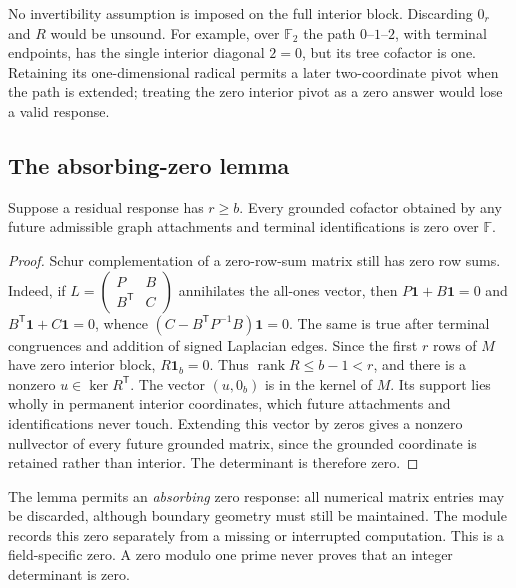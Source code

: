 No invertibility assumption is imposed on the full interior block.
Discarding $0_r$ and $R$ would be unsound.  For example, over
$\mathbb F_2$ the path $0$--$1$--$2$, with terminal endpoints, has the
single interior diagonal $2=0$, but its tree cofactor is one.  Retaining
its one-dimensional radical permits a later two-coordinate pivot when
the path is extended; treating the zero interior pivot as a zero answer
would lose a valid response.

\subsection{The absorbing-zero lemma}

\begin{lemma}
\label{lem:response-zero}
Suppose a residual response has $r\ge b$.  Every grounded cofactor
obtained by any future admissible graph attachments and terminal
identifications is zero over $\mathbb F$.
\end{lemma}

\begin{proof}
Schur complementation of a zero-row-sum matrix still has zero row sums.
Indeed, if
$L=\left(\begin{smallmatrix}P&B\\B^{\mathsf T}&C\end{smallmatrix}\right)$
annihilates the all-ones vector, then
$P\mathbf1+B\mathbf1=0$ and
$B^{\mathsf T}\mathbf1+C\mathbf1=0$, whence
$(C-B^{\mathsf T}P^{-1}B)\mathbf1=0$.
The same is true after terminal congruences and addition of signed
Laplacian edges.  Since the first $r$ rows of $M$ have zero interior
block, $R\mathbf1_b=0$.  Thus
$\operatorname{rank}R\le b-1<r$, and there is a nonzero
$u\in\ker R^{\mathsf T}$.  The vector $(u,0_b)$ is in the kernel of
$M$.  Its support lies wholly in permanent interior coordinates, which
future attachments and identifications never touch.  Extending this
vector by zeros gives a nonzero nullvector of every future grounded
matrix, since the grounded coordinate is retained rather than interior.
The determinant is therefore zero.
\end{proof}

The lemma permits an \emph{absorbing} zero response: all numerical
matrix entries may be discarded, although boundary geometry must still
be maintained.  The module records this zero separately from a missing
or interrupted computation.  This is a field-specific zero.  A zero
modulo one prime never proves that an integer determinant is zero.

